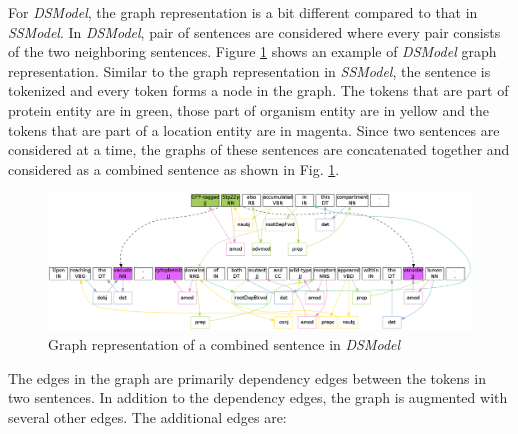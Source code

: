 
For \textit{DSModel}, the graph representation is a bit different compared to that in \textit{SSModel}. In \textit{DSModel}, pair of sentences are considered where every pair consists of the two neighboring sentences. Figure \ref{fig:DSGraph} shows an example of \textit{DSModel} graph representation. Similar to the graph representation in \textit{SSModel}, the sentence is tokenized and every token forms a node in the graph. The tokens that are part of protein entity are in green, those part of organism entity are in yellow and the tokens that are part of a location entity are in magenta. Since two sentences are considered at a time, the graphs of these sentences are concatenated together and considered as a combined sentence as shown in Fig. \ref{fig:DSGraph}.

\begin{figure}
\centering
\includegraphics[scale=0.3]{figures/DiffSentenceGraph.png}
\caption{Graph representation of a combined sentence in \textit{DSModel}}\label{fig:DSGraph}
\end{figure}

The edges in the graph are primarily dependency edges between the tokens in two sentences. In addition to the dependency edges, the graph is augmented with several other edges. The additional edges are:

